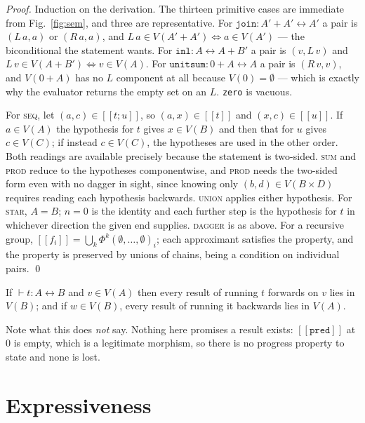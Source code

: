 \documentclass[runningheads,envcountsame]{llncs}
\newcommand{\den}[1]{\ensuremath{[\![#1]\!]}}
\newcommand{\iso}{\leftrightarrow}
\begin{document}
\begin{proof}
Induction on the derivation. The thirteen primitive cases are immediate from
Fig.~\ref{fig:sem}, and three are representative. For $\texttt{join} : A' + A' \iso
A'$ a pair is $(L\,a, a)$ or $(R\,a, a)$, and $L\,a \in V(A'+A') \iff a \in V(A')$
--- the biconditional the statement wants. For $\texttt{inl} : A \iso A + B'$ a pair
is $(v, L\,v)$ and $L\,v \in V(A+B') \iff v \in V(A)$. For
$\texttt{unitsum} : 0 + A \iso A$ a pair is $(R\,v, v)$, and $V(0+A)$ has no $L$
component at all because $V(0) = \emptyset$ --- which is exactly why the evaluator
returns the empty set on an $L$. \texttt{zero} is vacuous.

For \textsc{seq}, let $(a,c) \in \den{t\mathbin{;}u}$, so $(a,x) \in \den{t}$ and
$(x,c) \in \den{u}$. If $a \in V(A)$ the hypothesis for $t$ gives $x \in V(B)$ and
then that for $u$ gives $c \in V(C)$; if instead $c \in V(C)$, the hypotheses are
used in the other order. Both readings are available precisely because the
statement is two-sided. \textsc{sum} and \textsc{prod} reduce to the hypotheses
componentwise, and \textsc{prod} needs the two-sided form even with no dagger in
sight, since knowing only $(b,d) \in V(B \times D)$ requires reading each
hypothesis backwards. \textsc{union} applies either hypothesis. For \textsc{star},
$A = B$; $n = 0$ is the identity and each further step is the hypothesis for $t$ in
whichever direction the given end supplies. \textsc{dagger} is as above. For a
recursive group, $\den{f_i} = \bigcup_k \Phi^k(\emptyset,\dots,\emptyset)_i$; each approximant
satisfies the property, and the property is preserved by unions of chains, being a
condition on individual pairs. \qed
\end{proof}

\begin{corollary}\label{cor:cod}
If $\vdash t : A \iso B$ and $v \in V(A)$ then every result of running $t$ forwards
on $v$ lies in $V(B)$; and if $w \in V(B)$, every result of running it backwards
lies in $V(A)$.
\end{corollary}

Note what this does \emph{not} say. Nothing here promises a result exists:
$\den{\texttt{pred}}$ at $0$ is empty, which is a legitimate morphism, so there is
no progress property to state and none is lost.

\section{Expressiveness}\label{sec:expr}
\end{document}

